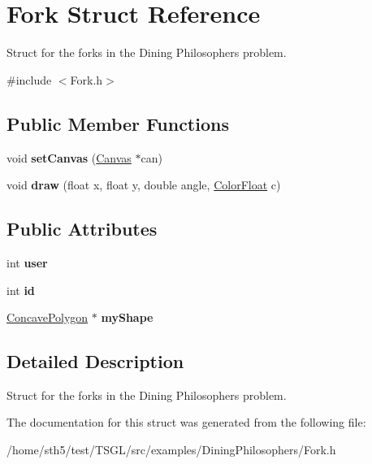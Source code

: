 \hypertarget{struct_fork}{}\section{Fork Struct Reference}
\label{struct_fork}


Struct for the forks in the Dining Philosophers\textquotesingle{} problem.  




{\ttfamily \#include $<$Fork.\+h$>$}

\subsection*{Public Member Functions}
\begin{DoxyCompactItemize}
\item 
\mbox{\label{struct_fork_a17aae2a4e6464c2ec8ac439443b7433e}} 
void {\bfseries set\+Canvas} (\hyperlink{classtsgl_1_1_canvas}{Canvas} $\ast$can)
\item 
\mbox{\label{struct_fork_a037d640832899cd5cad90b2c2ea4f4ec}} 
void {\bfseries draw} (float x, float y, double angle, \hyperlink{structtsgl_1_1_color_float}{Color\+Float} c)
\end{DoxyCompactItemize}
\subsection*{Public Attributes}
\begin{DoxyCompactItemize}
\item 
\mbox{\label{struct_fork_a28995f27196a2b80cf48024fd728d7df}} 
int {\bfseries user}
\item 
\mbox{\label{struct_fork_a72d6934869569aea1806a74e544b05f3}} 
int {\bfseries id}
\item 
\mbox{\label{struct_fork_aa1cd6cedb40e543d1ae4e7c8d9db24d7}} 
\hyperlink{classtsgl_1_1_concave_polygon}{Concave\+Polygon} $\ast$ {\bfseries my\+Shape}
\end{DoxyCompactItemize}


\subsection{Detailed Description}
Struct for the forks in the Dining Philosophers\textquotesingle{} problem. 

The documentation for this struct was generated from the following file\+:\begin{DoxyCompactItemize}
\item 
/home/sth5/test/\+T\+S\+G\+L/src/examples/\+Dining\+Philosophers/Fork.\+h\end{DoxyCompactItemize}
